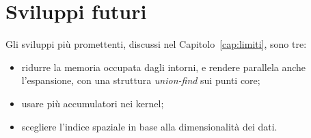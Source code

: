 \section*{Sviluppi futuri}

Gli sviluppi più promettenti, discussi nel Capitolo~\ref{cap:limiti}, sono tre:
\begin{itemize}
    \item ridurre la memoria occupata dagli intorni, e rendere parallela anche l'espansione, con una struttura \emph{union-find} sui punti core;
    \item usare più accumulatori nei kernel;
    \item scegliere l'indice spaziale in base alla dimensionalità dei dati.
\end{itemize}
